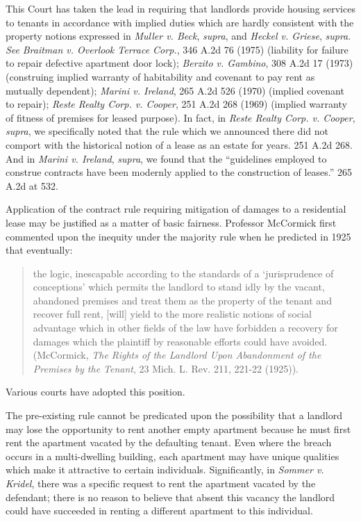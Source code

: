 This Court has taken the lead in requiring that landlords provide housing
services to tenants in accordance with implied duties which are hardly
consistent with the property notions expressed in \textit{Muller v. Beck},
\textit{supra}, and \textit{Heckel v. Griese}, \textit{supra}. \textit{See}
\textit{Braitman v. Overlook Terrace Corp.}, 346 A.2d 76 (1975) (liability for
failure to repair defective apartment door lock); \textit{Berzito v. Gambino},
308 A.2d 17 (1973) (construing implied warranty of habitability and covenant to
pay rent as mutually dependent); \textit{Marini v. Ireland}, 265 A.2d 526
(1970) (implied covenant to repair); \textit{Reste Realty Corp. v. Cooper}, 251
A.2d 268 (1969) (implied warranty of fitness of premises for leased purpose).
In fact, in \textit{Reste Realty Corp. v. Cooper}, \textit{supra}, we
specifically noted that the rule which we announced there did not comport with
the historical notion of a lease as an estate for years. 251 A.2d 268. And in
\textit{Marini v. Ireland}, \textit{supra}, we found that the ``guidelines
employed to construe contracts have been modernly applied to the construction
of leases.'' 265 A.2d at 532.

Application of the contract rule requiring mitigation of damages to a
residential lease may be justified as a matter of basic
fairness. Professor
McCormick first commented upon the inequity under the majority rule when he
predicted in 1925 that eventually:
\begin{quote}
the logic, inescapable according to the standards of a `jurisprudence of
conceptions' which permits the landlord to stand idly by the vacant, abandoned
premises and treat them as the property of the tenant and recover full rent,
[will] yield to the more realistic notions of social advantage which in other
fields of the law have forbidden a recovery for damages which the plaintiff by
reasonable efforts could have avoided. (McCormick, \textit{The Rights of the
Landlord Upon Abandonment of the Premises by the Tenant}, 23 Mich. L. Rev. 211,
221-22 (1925)).
\end{quote}
Various courts have adopted this position.

The pre-existing rule cannot be predicated upon the possibility that a landlord
may lose the opportunity to rent another empty apartment because he must first
rent the apartment vacated by the defaulting tenant. Even where the breach
occurs in a multi-dwelling building, each apartment may have unique qualities
which make it attractive to certain individuals. Significantly, in
\textit{Sommer v. Kridel}, there was a specific request to rent the apartment
vacated by the defendant; there is no reason to believe that absent this
vacancy the landlord could have succeeded in renting a different apartment to
this individual.

